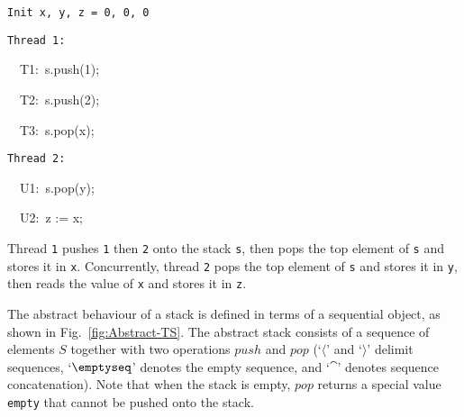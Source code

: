 \documentclass[11pt]{llncs}
\newcommand{\reffig}[1]{Fig.~\ref{#1}}
\begin{document}
  \hfill  \begin{minipage}[b]{0.9\linewidth}
    \small\tt Init x, y, z = 0, 0, 0
      \\
      \begin{minipage}[t]{0.4\columnwidth}
        \tt Thread 1:
        
        \ \ T1:\ s.push(1);
        
        \ \ T2:\ s.push(2);
        
        \ \ T3:\ s.pop(x);
        


      \end{minipage}
      \hfill
      \begin{minipage}[t]{0.4\columnwidth}
        \tt Thread 2:
        
        \ \ U1:\ s.pop(y);
        


        \ \ U2:\ z := x;
      \end{minipage}
    \end{minipage}      \smallskip

  \noindent
  Thread {\tt 1} pushes {\tt 1} then {\tt 2}
  onto the stack {\tt s}, then pops the top element of {\tt s} and
  stores it in {\tt x}. Concurrently, thread {\tt 2} pops the top
  element of {\tt s} and stores it in {\tt y}, then reads the value of
  {\tt x} and stores it in {\tt z}.

The abstract behaviour of a stack is defined in terms of a sequential
object, as shown in \reffig{fig:Abstract-TS}. The abstract stack consists
of a sequence of elements $S$ together with two operations $push$ and $pop$
(`$\langle$' and `$\rangle$' delimit sequences, `$\emptyseq$' denotes the
empty sequence, and `$\cat$' denotes sequence concatenation). Note that
when the stack is empty, $pop$ returns a special value {\tt empty} that
cannot be pushed onto the stack.
\end{document}
